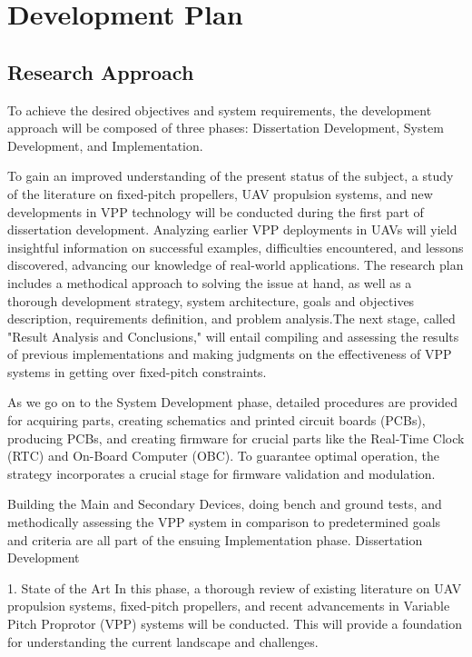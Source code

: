 \chapter{Development Plan}
\label{chap:Chapter5}
\section{Research Approach}
To achieve the desired objectives and system requirements, the development approach will be composed of three phases: Dissertation Development, System Development, and Implementation.

To gain an improved understanding of the present status of the subject, a study of the literature on fixed-pitch propellers, UAV propulsion systems, and new developments in VPP technology will be conducted during the first part of dissertation development.
Analyzing earlier VPP deployments in UAVs will yield insightful information on successful examples, difficulties encountered, and lessons discovered, advancing our knowledge of real-world applications.
The research plan includes a methodical approach to solving the issue at hand, as well as a thorough development strategy, system architecture, goals and objectives description, requirements definition, and problem analysis.The next stage, called "Result Analysis and Conclusions," will entail compiling and assessing the results of previous implementations and making judgments on the effectiveness of VPP systems in getting over fixed-pitch constraints.

As we go on to the System Development phase, detailed procedures are provided for acquiring parts, creating schematics and printed circuit boards (PCBs), producing PCBs, and creating firmware for crucial parts like the Real-Time Clock (RTC) and On-Board Computer (OBC).
To guarantee optimal operation, the strategy incorporates a crucial stage for firmware validation and modulation.

Building the Main and Secondary Devices, doing bench and ground tests, and methodically assessing the VPP system in comparison to predetermined goals and criteria are all part of the ensuing Implementation phase.
Dissertation Development

1. State of the Art
In this phase, a thorough review of existing literature on UAV propulsion systems, fixed-pitch propellers, and recent advancements in Variable Pitch Proprotor (VPP) systems will be conducted. 
This will provide a foundation for understanding the current landscape and challenges.

